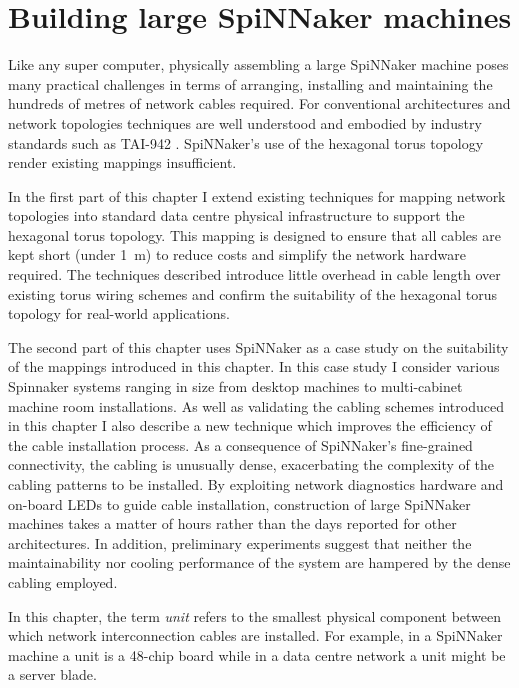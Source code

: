 \chapter{Building large SpiNNaker machines}
	
	\label{sec:building}
	
	Like any super computer, physically assembling a large SpiNNaker machine
	poses many practical challenges in terms of arranging, installing and
	maintaining the hundreds of metres of network cables required.  For
	conventional architectures and network topologies techniques are well
	understood and embodied by industry standards such as TAI-942 \cite{tia2006}.
	SpiNNaker's use of the hexagonal torus topology render existing mappings
	insufficient.
	
	In the first part of this chapter I extend existing techniques for mapping
	network topologies into standard data centre physical infrastructure to
	support the hexagonal torus topology. This mapping is designed to ensure that
	all cables are kept short (under \SI{1}{\meter}) to reduce costs and
	simplify the network hardware required. The techniques described introduce
	little overhead in cable length over existing torus wiring schemes
	and confirm the suitability of the hexagonal torus topology for real-world
	applications.
	
	The second part of this chapter uses SpiNNaker as a case study on the
	suitability of the mappings introduced in this chapter.  In this case study I
	consider various Spinnaker systems ranging in size from desktop machines to
	multi-cabinet machine room installations. As well as validating the cabling
	schemes introduced in this chapter I also describe a new technique which
	improves the efficiency of the cable installation process.  As a consequence
	of SpiNNaker's fine-grained connectivity, the cabling is unusually dense,
	exacerbating the complexity of the cabling patterns to be installed. By
	exploiting network diagnostics hardware and on-board LEDs to guide cable
	installation, construction of large SpiNNaker machines takes a matter of
	hours rather than the days reported for other architectures. In addition,
	preliminary experiments suggest that neither the maintainability nor cooling
	performance of the system are hampered by the dense cabling employed.
	
	In this chapter, the term \emph{unit} refers to the smallest physical
	component between which network interconnection cables are installed. For
	example, in a SpiNNaker machine a unit is a 48-chip board while in a data
	centre network a unit might be a server blade.
	
